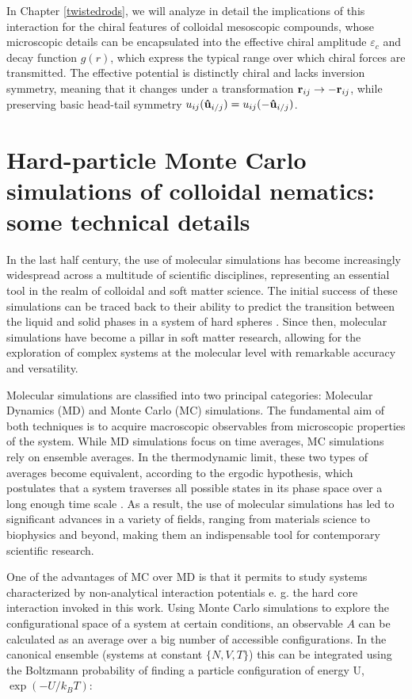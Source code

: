 In Chapter \ref{twistedrods}, we will analyze in detail the implications of this interaction for the chiral features of colloidal mesoscopic compounds, whose microscopic details can be encapsulated into the effective chiral amplitude $\varepsilon_c$ and decay function $g(r)$, which express the typical range over which chiral forces are transmitted. The effective potential is distinctly chiral and lacks inversion symmetry, meaning that it changes under a transformation ${\bf r}_{ij} \rightarrow -{\bf r}_{ij} $, while preserving basic head-tail symmetry $u_{ij}({\bf \hat{u}}_{i/j}) = u_{ij}(-{\bf \hat{u}}_{i/j}) $.

\section[HPMC simulations of colloidal nematics]{Hard-particle Monte Carlo simulations of colloidal nematics: some technical details}

In the last half century, the use of molecular simulations has become increasingly widespread across a multitude of scientific disciplines, representing an essential tool in the realm of colloidal and soft matter science. The initial success of these simulations can be traced back to their ability to predict the transition between the liquid and solid phases in a system of hard spheres \cite{ALDER57,WOOD57}. Since then, molecular simulations have become a pillar in soft matter research, allowing for the exploration of complex systems at the molecular level with remarkable accuracy and versatility.

Molecular simulations are classified into two principal categories: Molecular Dynamics (MD) and Monte Carlo (MC) simulations. The fundamental aim of both techniques is to acquire macroscopic observables from microscopic properties of the system. While MD simulations focus on time averages, MC simulations rely on ensemble averages. In the thermodynamic limit, these two types of averages become equivalent, according to the ergodic hypothesis, which postulates that a system traverses all possible states in its phase space over a long enough time scale \cite{dfrenkel96:mc}. As a result, the use of molecular simulations has led to significant advances in a variety of fields, ranging from materials science to biophysics and beyond, making them an indispensable tool for contemporary scientific research.

One of the advantages of MC over MD is that it permits to study systems characterized by non-analytical interaction potentials e. g. the hard core interaction invoked in this work. Using Monte Carlo simulations to explore the configurational space of a system at certain conditions, an observable $A$ can be calculated as an average over a big number of accessible configurations. In the canonical ensemble (systems at constant $\{N,V,T\}$) this can be integrated using the Boltzmann probability of finding a particle configuration of energy U, $\exp( -U/k_{B}T)$:

